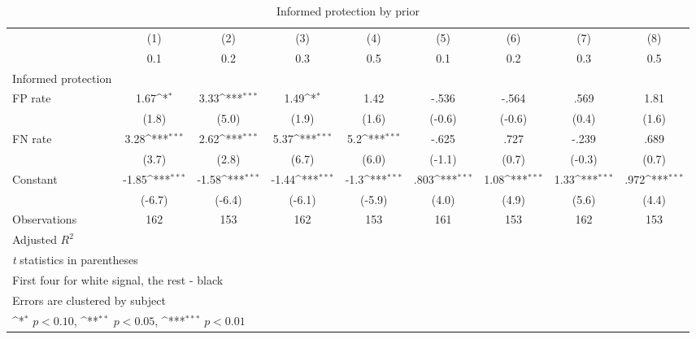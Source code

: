 \begin{table}[htbp]\centering
\def\sym#1{\ifmmode^{#1}\else\(^{#1}\)\fi}
\caption{Informed protection by prior}
\begin{tabular}{l*{8}{c}}
\hline\hline
                &\multicolumn{1}{c}{(1)}&\multicolumn{1}{c}{(2)}&\multicolumn{1}{c}{(3)}&\multicolumn{1}{c}{(4)}&\multicolumn{1}{c}{(5)}&\multicolumn{1}{c}{(6)}&\multicolumn{1}{c}{(7)}&\multicolumn{1}{c}{(8)}\\
                &\multicolumn{1}{c}{0.1}&\multicolumn{1}{c}{0.2}&\multicolumn{1}{c}{0.3}&\multicolumn{1}{c}{0.5}&\multicolumn{1}{c}{0.1}&\multicolumn{1}{c}{0.2}&\multicolumn{1}{c}{0.3}&\multicolumn{1}{c}{0.5}\\
\hline
Informed protection&                  &                  &                  &                  &                  &                  &                  &                  \\
FP rate         &     1.67\sym{*}  &     3.33\sym{***}&     1.49\sym{*}  &     1.42         &    -.536         &    -.564         &     .569         &     1.81         \\
                &    (1.8)         &    (5.0)         &    (1.9)         &    (1.6)         &   (-0.6)         &   (-0.6)         &    (0.4)         &    (1.6)         \\
FN rate         &     3.28\sym{***}&     2.62\sym{***}&     5.37\sym{***}&      5.2\sym{***}&    -.625         &     .727         &    -.239         &     .689         \\
                &    (3.7)         &    (2.8)         &    (6.7)         &    (6.0)         &   (-1.1)         &    (0.7)         &   (-0.3)         &    (0.7)         \\
Constant        &    -1.85\sym{***}&    -1.58\sym{***}&    -1.44\sym{***}&     -1.3\sym{***}&     .803\sym{***}&     1.08\sym{***}&     1.33\sym{***}&     .972\sym{***}\\
                &   (-6.7)         &   (-6.4)         &   (-6.1)         &   (-5.9)         &    (4.0)         &    (4.9)         &    (5.6)         &    (4.4)         \\
\hline
Observations    &      162         &      153         &      162         &      153         &      161         &      153         &      162         &      153         \\
Adjusted \(R^{2}\)&                  &                  &                  &                  &                  &                  &                  &                  \\
\hline\hline
\multicolumn{9}{l}{\footnotesize \textit{t} statistics in parentheses}\\
\multicolumn{9}{l}{\footnotesize First four for white signal, the rest - black}\\
\multicolumn{9}{l}{\footnotesize Errors are clustered by subject}\\
\multicolumn{9}{l}{\footnotesize \sym{*} \(p<0.10\), \sym{**} \(p<0.05\), \sym{***} \(p<0.01\)}\\
\end{tabular}
\end{table}
